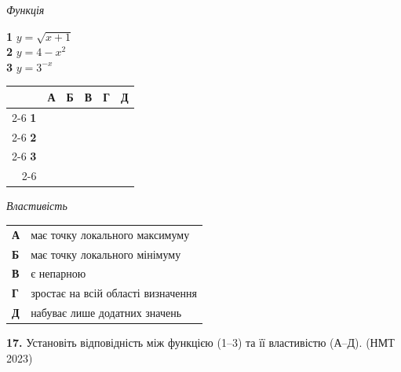 \documentclass[14pt]{extarticle}
\newcommand{\nmtyear}[1]{\hfill{\small\color{yearcolor}(НМТ #1)}}
\begin{document}
\noindent
\begin{minipage}[t]{0.45\textwidth}
    \textit{Функція} \par \vspace{0.2cm}
    \textbf{1} \quad $y = \sqrt{x+1}$ \\[0.2cm]
    \textbf{2} \quad $y = 4-x^2$ \\[0.2cm]
    \textbf{3} \quad $y = 3^{-x}$
    
    \vspace{0.5cm}
    
    \begingroup
    \setlength{\tabcolsep}{4pt}
    \renewcommand{\arraystretch}{1.2}
    \small
    \begin{tabular}{r|c|c|c|c|c|}
         \multicolumn{1}{c}{} & \multicolumn{1}{c}{\textbf{А}} & \multicolumn{1}{c}{\textbf{Б}} & \multicolumn{1}{c}{\textbf{В}} & \multicolumn{1}{c}{\textbf{Г}} & \multicolumn{1}{c}{\textbf{Д}} \\ \cline{2-6}
         \textbf{1} & & & & & \\ \cline{2-6}
         \textbf{2} & & & & & \\ \cline{2-6}
         \textbf{3} & & & & & \\ \cline{2-6}
    \end{tabular}
    \endgroup
\end{minipage}%
\hfill
\begin{minipage}[t]{0.50\textwidth}
    \textit{Властивість} \par \vspace{0.2cm}
    \begin{tabular}{l p{8.5cm}}
    \textbf{А} & має точку локального максимуму \\
    \textbf{Б} & має точку локального мінімуму \\
    \textbf{В} & є непарною \\
    \textbf{Г} & зростає на всій області визначення \\
    \textbf{Д} & набуває лише додатних значень \\
    \end{tabular}
\end{minipage}

\vspace{0.7cm}

\noindent\textbf{17.} Установіть відповідність між функцією (1--3) та її властивістю (А--Д). \nmtyear{2023}

\vspace{0.3cm}
\end{document}
